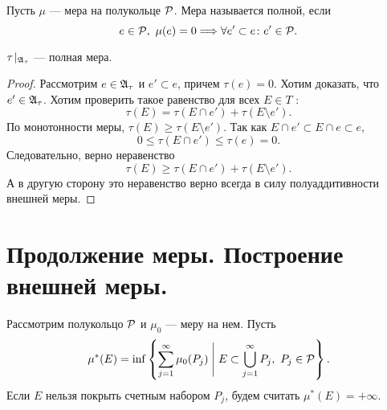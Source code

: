 \begin{defn}
    Пусть $ \mu $ --- мера на полукольце $ \P$. Мера называется {\sf полной}, если
	\[
		e \in \P, ~ \mu(e) = 0 \Longrightarrow \forall e' \subset e \colon e' \in \P
	.\] 
\end{defn}
\begin{cor}
    $ \tau\!\mid_{\A_{\tau }} $ --- полная мера.
\end{cor}
\begin{proof}
	Рассмотрим $ e \in \A_{\tau }$ и $ e' \subset e$, причем $ \tau (e) = 0$. Хотим доказать, что $ e' \in \A_{\tau }$.
	Хотим проверить такое равенство для всех $ E \in T$ :
	\[
		\tau (E) = \tau (E\cap e') + \tau (E \setminus e')
	.\] 
	По монотонности меры, $ \tau (E) \ge \tau (E \setminus e')$.
	Так как $ E \cap e' \subset E \cap e \subset e$,
	\[
		0 \le \tau (E \cap e') \le \tau (e) = 0
	.\] 
	Следовательно, верно неравенство 
	\[
		\tau (E) \ge  \tau (E \cap e') + \tau (E \setminus e')
	.\] 
	А в другую сторону это неравенство верно всегда в силу полуаддитивности внешней меры.
\end{proof}

\section{Продолжение меры. Построение внешней меры.}
\begin{name}
    Рассмотрим полукольцо $ \P$ и $ \mu _0$ --- меру на нем. Пусть 
	\[
		\mu ^{*}(E) = \inf \left\{ \sum_{j=1}^{\infty} \mu _0(P_j) \Biggm| E \subset \bigcup_{j=1}^{\infty} P_j, ~ P_j \in \P \right\}
	.\] 
	Если $ E$ нельзя покрыть счетным набором $ P_j$, будем считать $ \mu ^{*} (E)= +\infty$.
\end{name}

